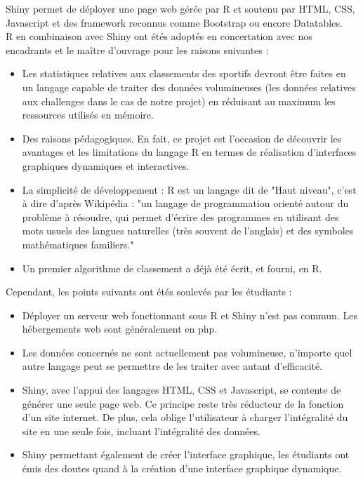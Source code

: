 \documentclass[12pt,a4paper]{report}
\begin{document}
Shiny permet de déployer une page web gérée par R et soutenu par HTML, CSS, Javascript et des framework reconnus comme Bootstrap ou encore Datatables.\\


R en combinaison avec Shiny ont étés adoptés en concertation avec nos encadrants et le maître d’ouvrage pour les raisons suivantes :
\begin{itemize} 
\item Les statistiques relatives aux classements des sportifs  devront être  faites en un langage capable de traiter des données volumineuses (les données relatives aux challenges dans le cas de notre projet) en réduisant au maximum les ressources utilisés en mémoire.
\item Des raisons pédagogiques. En fait, ce projet est l’occasion de découvrir les avantages et les limitations du langage R en termes de réalisation d’interfaces graphiques dynamiques et interactives.
\item La simplicité de développement : R est un langage dit de "Haut niveau", c'est à dire d'après Wikipédia : "un langage de programmation orienté autour du problème à résoudre, qui permet d'écrire des programmes en utilisant des mots usuels des langues naturelles (très souvent de l'anglais) et des symboles mathématiques familiers."
\item Un premier algorithme de classement a déjà été écrit, et fourni, en R.
\end{itemize}

Cependant, les points suivants ont étés soulevés par les étudiants :

\begin{itemize} 
	\item Déployer un serveur web fonctionnant sous R et Shiny n'est pas commun. Les hébergements web sont généralement en php.
	\item Les données concernés ne sont actuellement pas volumineuse, n'importe quel autre langage peut se permettre de les traiter avec autant d'efficacité.
	\item Shiny, avec l'appui des langages HTML, CSS et Javascript, se contente de générer une seule page web. Ce principe reste très réducteur de la fonction d'un site internet. De plus, cela oblige l'utilisateur à charger l'intégralité du site en une seule fois, incluant l'intégralité des données.
	\item Shiny permettant également de créer l'interface graphique, les étudiants ont émis des doutes quand à la création d'une interface graphique dynamique.
\end{itemize}
\end{document}
